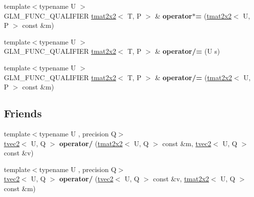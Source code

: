 \begin{DoxyCompactItemize}
\item 
{\footnotesize template$<$typename U $>$ }\\G\+L\+M\+\_\+\+F\+U\+N\+C\+\_\+\+Q\+U\+A\+L\+I\+F\+I\+ER \hyperlink{structglm_1_1detail_1_1tmat2x2}{tmat2x2}$<$ T, P $>$ \& {\bfseries operator$\ast$=} (\hyperlink{structglm_1_1detail_1_1tmat2x2}{tmat2x2}$<$ U, P $>$ const \&m)\hypertarget{structglm_1_1detail_1_1tmat2x2_a8487379d072e00b6de5a77b7e655867b}{}\label{structglm_1_1detail_1_1tmat2x2_a8487379d072e00b6de5a77b7e655867b}

\item 
{\footnotesize template$<$typename U $>$ }\\G\+L\+M\+\_\+\+F\+U\+N\+C\+\_\+\+Q\+U\+A\+L\+I\+F\+I\+ER \hyperlink{structglm_1_1detail_1_1tmat2x2}{tmat2x2}$<$ T, P $>$ \& {\bfseries operator/=} (U s)\hypertarget{structglm_1_1detail_1_1tmat2x2_a76aee63b12a716f287b47869fe0278e4}{}\label{structglm_1_1detail_1_1tmat2x2_a76aee63b12a716f287b47869fe0278e4}

\item 
{\footnotesize template$<$typename U $>$ }\\G\+L\+M\+\_\+\+F\+U\+N\+C\+\_\+\+Q\+U\+A\+L\+I\+F\+I\+ER \hyperlink{structglm_1_1detail_1_1tmat2x2}{tmat2x2}$<$ T, P $>$ \& {\bfseries operator/=} (\hyperlink{structglm_1_1detail_1_1tmat2x2}{tmat2x2}$<$ U, P $>$ const \&m)\hypertarget{structglm_1_1detail_1_1tmat2x2_a59558381fd4daac499407f3d83e71da0}{}\label{structglm_1_1detail_1_1tmat2x2_a59558381fd4daac499407f3d83e71da0}

\end{DoxyCompactItemize}
\subsection*{Friends}
\begin{DoxyCompactItemize}
\item 
{\footnotesize template$<$typename U , precision Q$>$ }\\\hyperlink{structglm_1_1detail_1_1tvec2}{tvec2}$<$ U, Q $>$ {\bfseries operator/} (\hyperlink{structglm_1_1detail_1_1tmat2x2}{tmat2x2}$<$ U, Q $>$ const \&m, \hyperlink{structglm_1_1detail_1_1tvec2}{tvec2}$<$ U, Q $>$ const \&v)\hypertarget{structglm_1_1detail_1_1tmat2x2_a6d8b6618f8e231cea3dec1d6b21d7de3}{}\label{structglm_1_1detail_1_1tmat2x2_a6d8b6618f8e231cea3dec1d6b21d7de3}

\item 
{\footnotesize template$<$typename U , precision Q$>$ }\\\hyperlink{structglm_1_1detail_1_1tvec2}{tvec2}$<$ U, Q $>$ {\bfseries operator/} (\hyperlink{structglm_1_1detail_1_1tvec2}{tvec2}$<$ U, Q $>$ const \&v, \hyperlink{structglm_1_1detail_1_1tmat2x2}{tmat2x2}$<$ U, Q $>$ const \&m)\hypertarget{structglm_1_1detail_1_1tmat2x2_af5138f235b2448c769a37e7d222a5ab6}{}\label{structglm_1_1detail_1_1tmat2x2_af5138f235b2448c769a37e7d222a5ab6}

\end{DoxyCompactItemize}


